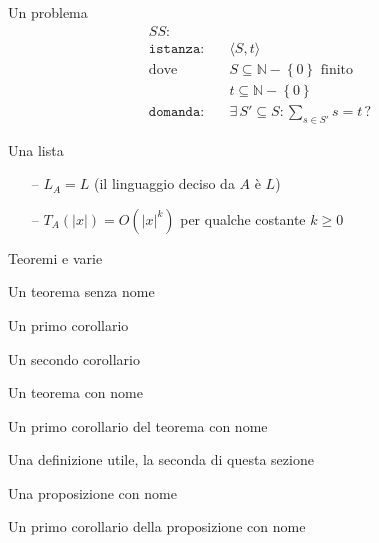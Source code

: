 Un problema
\begin{align*}
    SS: & \\
    \texttt{istanza:} \quad & \langle S,t \rangle \\
    \text{dove} \quad & S \subseteq \mathbb{N} - \left\{ 0 \right\} \text{ finito} \\
    & t \subseteq \mathbb{N} - \left\{ 0 \right\} \\
    \texttt{domanda:} \quad & \exists \, S' \subseteq S : \sum_{s \in S'}^{} s = t \, ?
\end{align*}

Una lista
\begin{itemize}[noitemsep,parsep=0pt,partopsep=0pt,topsep=0pt]
    \item[--] $L_A = L$ (il linguaggio deciso da $A$ è $L$)
    \item[--] $T_A(|x|) = O(|x|^k)$ per qualche costante $k \geq 0$
\end{itemize}

Teoremi e varie

\begin{theorem}
    Un teorema senza nome
\end{theorem}

\begin{corollario}
    Un primo corollario
\end{corollario}

\begin{corollario}
    Un secondo corollario
\end{corollario}

\begin{theorem}
    Un teorema con nome
\end{theorem}

\begin{corollario}
    Un primo corollario del teorema con nome
\end{corollario}

\begin{definition}
    Una definizione utile, la seconda di questa sezione
\end{definition}

\begin{proposizione}
    Una proposizione con nome
\end{proposizione}

\begin{corollario}
    Un primo corollario della proposizione con nome
\end{corollario}

